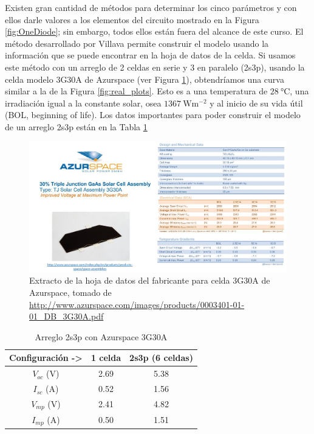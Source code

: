 \documentclass[12pt]{article}
\begin{document}
Existen gran cantidad de métodos para determinar los cinco parámetros y con ellos darle valores a los elementos del circuito mostrado en la Figura \ref{fig:OneDiode}; sin embargo, todos ellos están fuera del alcance de este curso. El método desarrollado por Villava \cite{villalva2009modeling} permite construir el modelo usando la información que se puede encontrar en la hoja de datos de la celda. Si usamos este método con un arreglo de 2 celdas en serie y 3 en paralelo (2s3p), usando la celda modelo 3G30A de Azurspace (ver Figura \ref{fig:3G30A}), obtendríamos una curva similar a la de la Figura \ref{fig:real_plots}. Esto es a una temperatura de $\SI{28}{\celsius}$, una irradiación igual a la constante solar, osea $\SI{1367}{\watt\meter^{-2}}$ y al inicio de su vida útil (BOL, beginning of life). Los datos importantes para poder construir el modelo de un arreglo 2s3p están en la Tabla \ref{t:cell}

\begin{figure}[H]
    \centering
    \includegraphics[width=0.95\linewidth]{fig/3G30A.JPG}
    \caption{Extracto de la hoja de datos del fabricante para celda 3G30A de Azurspace, tomado de \url{http://www.azurspace.com/images/products/0003401-01-01_DB_3G30A.pdf}}
    \label{fig:3G30A}
\end{figure}

\begin{table}[H]
	\footnotesize
	\centering
	\caption{Arreglo 2s3p con Azurspace 3G30A}
	\vspace{0.2cm}
	\begin{tabular}{ccc} 
		\toprule
		\textbf{Configuración ->} & \textbf{1 celda} & \textbf{2s3p (6 celdas)} \\
		\midrule
		$V_{oc}$ (V) & 2.69 & 5.38 \\
		$I_{sc}$ (A) & 0.52 & 1.56 \\
		$V_{mp}$ (V) & 2.41 & 4.82 \\
		$I_{mp}$ (A) & 0.50 & 1.51 \\ 
		\bottomrule
    \end{tabular}
    \label{t:cell}
\end{table}
\end{document}
